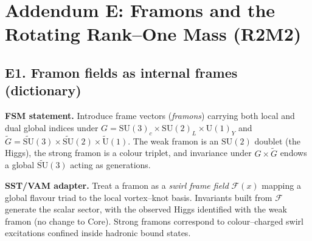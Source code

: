 \documentclass[11pt]{article}
\begin{document}
  \titlepageOpen

  \begin{abstract}


  \end{abstract}

  \titlepageClose
  \fi

  \ifdefined\standalonechapter
  \section{\papertitle}
  \else
  \fi


  \section*{Addendum E: Framons and the Rotating Rank–One Mass (R2M2)}

      \subsection*{E1. Framon fields as internal frames (dictionary)}
          \textbf{FSM statement.} Introduce frame vectors (\emph{framons}) carrying both local and dual global indices under
          $G=\mathrm{SU}(3)_c\times\mathrm{SU}(2)_L\times\mathrm{U}(1)_Y$ and
          $\tilde G=\widetilde{\mathrm{SU}}(3)\times\widetilde{\mathrm{SU}}(2)\times\widetilde{\mathrm{U}}(1)$.
          The weak framon is an $\mathrm{SU}(2)$ doublet (the Higgs), the strong framon is a colour triplet, and invariance under $G\times\tilde G$ endows a global $\widetilde{\mathrm{SU}}(3)$ acting as generations.

          \textbf{SST/VAM adapter.} Treat a framon as a \emph{swirl frame field} $\mathcal F(x)$ mapping a global flavour triad to the local vortex–knot basis. Invariants built from $\mathcal F$ generate the scalar sector, with the observed Higgs identified with the weak framon (no change to Core). Strong framons correspond to colour–charged swirl excitations confined inside hadronic bound states.
\end{document}
